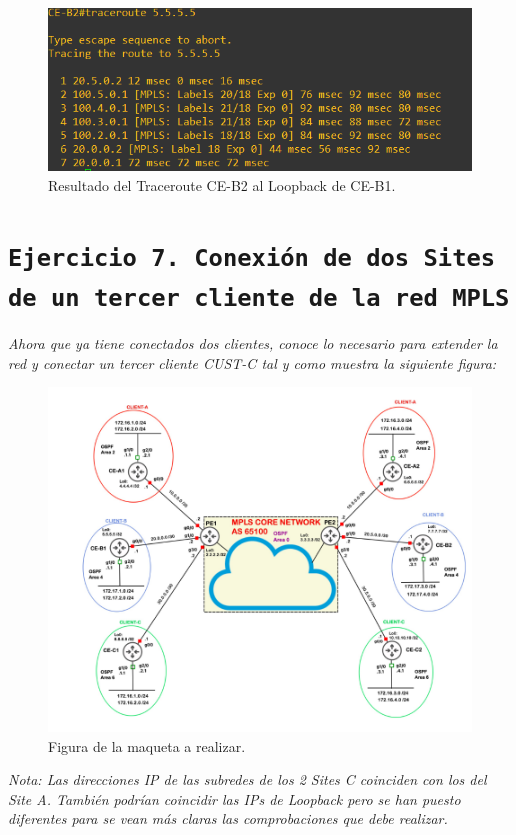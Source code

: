 \documentclass[a4paper, 12pt]{report}
\begin{document}
\begin{figure}[H]
	\centering
	\includegraphics[scale=0.6]{traceroute5555.png}
	\caption{Resultado del Traceroute CE-B2 al Loopback de CE-B1.}
	\label{fig:traceroute5555}
\end{figure}
\newpage
\section{\texttt{Ejercicio 7. Conexión de dos Sites de un tercer cliente de la red MPLS}}

\textit{Ahora que ya tiene conectados dos clientes, conoce lo necesario para extender la red y conectar
un tercer cliente CUST-C tal y como muestra la siguiente figura:}

\begin{figure}[H]
	\centering
	\includegraphics[scale=0.6]{fig3.png}
	\caption{Figura de la maqueta a realizar.}
	\label{fig:fig3}
\end{figure}

\textit{Nota: Las direcciones IP de las subredes de los 2 Sites C coinciden con los del Site A. También
podrían coincidir las IPs de Loopback pero se han puesto diferentes para se vean más claras las
comprobaciones que debe realizar.}
\end{document}
